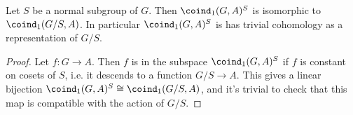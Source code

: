 

\begin{lemma}	\label{lem:coind₁ invariants}
	\leanok
	Let $S$ be a normal subgroup of $G$. Then $\coind_1(G,A)^S$ is isomorphic to $\coind_1(G/S,A)$.
	In particular $\coind_1(G,A)^S$ is has trivial cohomology as a representation of $G/S$.
\end{lemma}

\begin{proof}
	\leanok
	Let $f : G \to A$. Then $f$ is in the subspace $\coind_1(G,A)^S$ if $f$ is constant on
	cosets of $S$, i.e. it descends to a function $G/S \to A$.
	This gives a linear bijection $\coind_1(G,A)^S \cong \coind_1(G/S,A)$, and it's trivial to check
	that this map is compatible with the action of $G / S$.
\end{proof}

